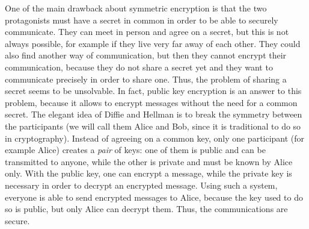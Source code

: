 One of the main drawback about symmetric encryption is that the two
protagonists must have a secret in common in order to be able to securely
communicate. They can meet in person and agree on a secret, but this is not
always possible, for example if they live very far away of each other. They
could also find another way of communication, but then they cannot encrypt their
communication, because they do not share a secret yet and they want to
communicate precisely in order to share one. Thus, the problem of sharing a
secret seems to be unsolvable. In fact, public key encryption is an answer to
this problem, because it allows to encrypt messages without the need for a
common secret. The elegant idea of Diffie and Hellman is to break the symmetry
between the participants (we will call them Alice and Bob, since it is
traditional to do so in cryptography). Instead of agreeing on a common key, only
one participant (for example Alice) creates a \emph{pair} of keys: one of them
is public and can be transmitted to anyone, while the other is private and must
be known by Alice only. With the public key, one can encrypt a message, while
the private key is necessary in order to decrypt an encrypted message. Using
such a system, everyone is able to send encrypted messages to Alice, because the
key used to do so is public, but only Alice can decrypt them. Thus, the
communications are secure.
